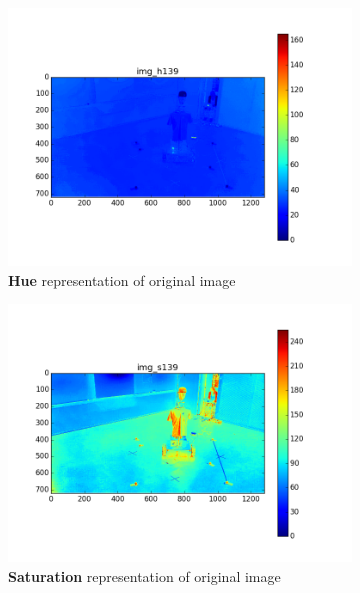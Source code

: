 \begin{figure}[htb]
\begin{subfigure}[b]{0.49\linewidth}
		\includegraphics[width=\linewidth]{files/_img_h139.png}
		\caption{\textbf{Hue} representation of original image}
		\label{fig:img_h}
	\end{subfigure}
	\begin{subfigure}[b]{0.49\linewidth}
        \centering
		\includegraphics[width=\linewidth]{files/_img_s139.png}
		\caption{\textbf{Saturation} representation of original image}
		\label{fig:img_s}
	\end{subfigure}
	\begin{subfigure}[b]{0.49\linewidth}
        \centering

\end{subfigure}
\end{figure}
